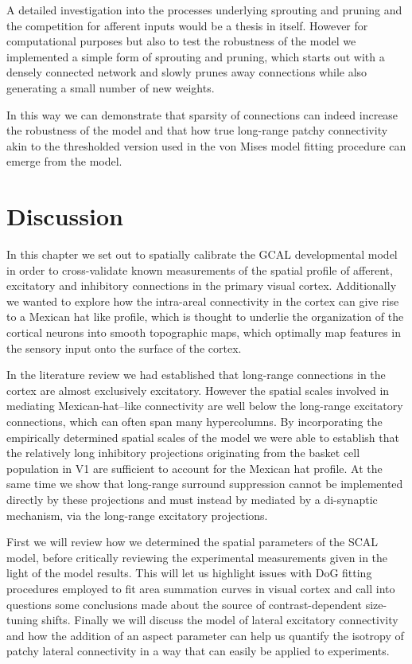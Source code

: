 A detailed investigation into the processes underlying sprouting and
pruning and the competition for afferent inputs would be a thesis in
itself. However for computational purposes but also to test the
robustness of the model we implemented a simple form of sprouting and
pruning, which starts out with a densely connected network and slowly
prunes away connections while also generating a small number of new
weights.

In this way we can demonstrate that sparsity of connections can indeed
increase the robustness of the model and that how true long-range
patchy connectivity akin to the thresholded version used in the von
Mises model fitting procedure can emerge from the model.

\section{Discussion}

In this chapter we set out to spatially calibrate the GCAL
developmental model in order to cross-validate known measurements of
the spatial profile of afferent, excitatory and inhibitory connections
in the primary visual cortex. Additionally we wanted to explore how
the intra-areal connectivity in the cortex can give rise to a Mexican
hat like profile, which is thought to underlie the organization of the
cortical neurons into smooth topographic maps, which optimally map
features in the sensory input onto the surface of the cortex.

In the literature review we had established that long-range
connections in the cortex are almost exclusively excitatory. However
the spatial scales involved in mediating Mexican-hat--like connectivity
are well below the long-range excitatory connections, which can often
span many hypercolumns. By incorporating the empirically determined
spatial scales of the model we were able to establish that the
relatively long inhibitory projections originating from the basket cell
population in V1 are sufficient to account for the Mexican hat
profile. At the same time we show that long-range surround suppression
cannot be implemented directly by these projections and must instead by
mediated by a di-synaptic mechanism, via the long-range excitatory
projections.

First we will review how we determined the spatial parameters of the
SCAL model, before critically reviewing the experimental measurements
given in the light of the model results. This will let us highlight
issues with DoG fitting procedures employed to fit area summation
curves in visual cortex and call into questions some conclusions made
about the source of contrast-dependent size-tuning shifts. Finally we
will discuss the model of lateral excitatory connectivity and how the
addition of an aspect parameter can help us quantify the isotropy of
patchy lateral connectivity in a way that can easily be applied to
experiments.

